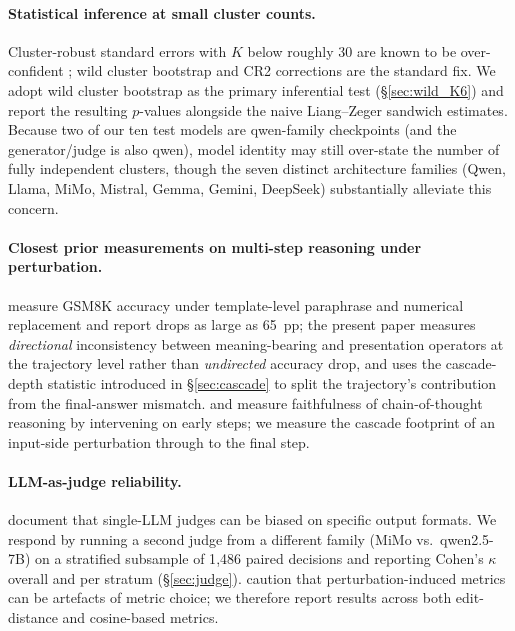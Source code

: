 \documentclass[11pt]{article}
\begin{document}
\paragraph{Statistical inference at small cluster counts.} Cluster-robust standard errors with $K$ below roughly 30 are known to be over-confident \citep{liang1986longitudinal}; wild cluster bootstrap \citep{cameron2008bootstrap,roodman2019fast} and CR2 corrections are the standard fix. We adopt wild cluster bootstrap as the primary inferential test (\S\ref{sec:wild_K6}) and report the resulting $p$-values alongside the naive Liang--Zeger sandwich estimates. Because two of our ten test models are qwen-family checkpoints (and the generator/judge is also qwen), model identity may still over-state the number of fully independent clusters, though the seven distinct architecture families (Qwen, Llama, MiMo, Mistral, Gemma, Gemini, DeepSeek) substantially alleviate this concern.

\paragraph{Closest prior measurements on multi-step reasoning under perturbation.} \citet{mirzadeh2024gsm} measure GSM8K accuracy under template-level paraphrase and numerical replacement and report drops as large as 65~pp; the present paper measures \emph{directional} inconsistency between meaning-bearing and presentation operators at the trajectory level rather than \emph{undirected} accuracy drop, and uses the cascade-depth statistic introduced in \S\ref{sec:cascade} to split the trajectory's contribution from the final-answer mismatch. \citet{lanham2023measuring} and \citet{turpin2023language} measure faithfulness of chain-of-thought reasoning by intervening on early steps; we measure the cascade footprint of an input-side perturbation through to the final step.

\paragraph{LLM-as-judge reliability.} \citet{zheng2023judging} document that single-LLM judges can be biased on specific output formats. We respond by running a second judge from a different family (MiMo vs.\ qwen2.5-7B) on a stratified subsample of 1{,}486 paired decisions and reporting Cohen's $\kappa$ overall and per stratum (\S\ref{sec:judge}). \citet{schaeffer2023emergent} caution that perturbation-induced metrics can be artefacts of metric choice; we therefore report results across both edit-distance and cosine-based metrics.
\end{document}
